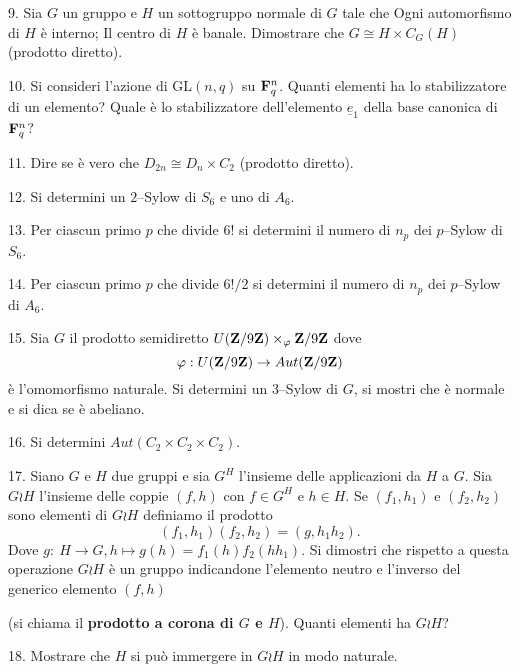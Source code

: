 \item{9.} Sia $G$ un gruppo e $H$ un sottogruppo normale di $G$ tale che
 Ogni automorfismo di $H$ \`{e} interno;
 Il centro di $H$ \`{e} banale.
Dimostrare che $G\cong H\times C_G(H)$ (prodotto diretto).

\item{10.} Si consideri l'azione di GL$(n,q)$ su ${\bf F}_q^n$. Quanti elementi
ha lo stabilizzatore di un elemento? Quale \`{e} lo stabilizzatore dell'elemento
$\underline{e}_1$ della base canonica di ${\bf F}_q^n$?

\item{11.} Dire se \`{e} vero che $D_{2n}\cong D_n\times C_2$ (prodotto diretto).

\item{12.} Si determini un $2$--Sylow di $S_6$ e uno di $A_6$. 

\item{13.} Per ciascun primo $p$ che divide $6!$ si determini il numero di $n_p$
dei $p$--Sylow di $S_6$.

\item{14.} Per ciascun primo $p$ che divide $6!/2$ si determini il numero di $n_p$
dei $p$--Sylow di $A_6$.

\item{15.} Sia $G$ il prodotto semidiretto 
$U({\bf Z}/9{\bf Z})\times_\varphi {\bf Z}/9{\bf Z}$ dove 
$$\varphi: U({\bf Z}/9{\bf Z})
\rightarrow Aut({\bf Z}/9{\bf Z})$$
\`{e} l'omomorfismo naturale. Si determini un $3$--Sylow di $G$, si mostri che
\`{e} normale e si dica se \`{e} abeliano.

\item{16.} Si determini $Aut(C_2\times C_2\times C_2)$.

\item{17.} Siano $G$ e $H$ due gruppi e sia $G^H$ l'insieme delle applicazioni da
$H$ a $G$. Sia $G\wr H$ l'insieme delle coppie $(f,h)$ con $f\in G^H$ e $h\in H$. Se 
$(f_1,h_1)$ e $(f_2,h_2)$ sono elementi di $G\wr H$ definiamo il prodotto
$$(f_1,h_1)(f_2,h_2)=(g,h_1h_2).$$
Dove $g:\ H\rightarrow G, h\mapsto g(h)=f_1(h)f_2(hh_1)$.
Si dimostri che rispetto a questa operazione $G\wr H$ \`{e} un gruppo indicandone
l'elemento neutro e l'inverso del generico elemento $(f,h)$\par (si chiama il
{\bf prodotto a corona di $G$ e $H$}). Quanti elementi ha $G\wr H$?

\item{18.} Mostrare che $H$ si pu\`{o} immergere in $G\wr H$ in modo
naturale.

